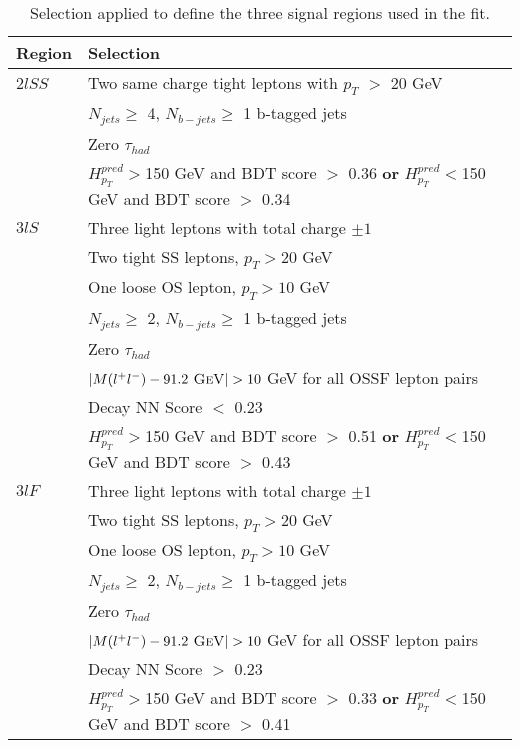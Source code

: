 \begin{table}[H]
  \begin{center}
  \begin{tabular}{ll}
  \hline\hline
  Region & Selection \\
  \hline
  $2lSS$ & Two same charge tight leptons with $p_T$ $>$ 20 GeV \\
  & $N_{jets}\geq$ 4, $N_{b-jets}\geq$ 1 b-tagged jets \\
  & Zero $\tau_{had}$\\
  & $H^{pred}_{p_T}>$150 GeV and BDT score $>$ 0.36 \textbf{or} $H^{pred}_{p_T}<$150 GeV and BDT score $>$ 0.34 \\
  \hline
  $3lS$ & Three light leptons with total charge $\pm 1$ \\
  & Two tight SS leptons, $p_T > 20$ GeV \\
  & One loose OS lepton, $p_T > 10$ GeV \\
  & $N_{jets}\geq$ 2, $N_{b-jets}\geq$ 1 b-tagged jets \\
  & Zero $\tau_{had}$ \\           
  & $|M(l^+l^-)-91.2\textsc{ GeV}| > 10$ GeV for all OSSF lepton pairs \\
  & Decay NN Score $<$ 0.23 \\
  & $H^{pred}_{p_T}>$150 GeV and BDT score $>$ 0.51 \textbf{or} $H^{pred}_{p_T}<$150 GeV and BDT score $>$ 0.43 \\
  \hline
  $3lF$ & Three light leptons with total charge $\pm 1$ \\
  & Two tight SS leptons, $p_T > 20$ GeV \\                                                                                  
  & One loose OS lepton, $p_T > 10$ GeV \\                                                                                   
  & $N_{jets}\geq$ 2, $N_{b-jets}\geq$ 1 b-tagged jets \\
  & Zero $\tau_{had}$ \\
  & $|M(l^+l^-)-91.2\textsc{ GeV}| > 10$ GeV for all OSSF lepton pairs \\                                                 
  & Decay NN Score $>$ 0.23 \\
  & $H^{pred}_{p_T}>$150 GeV and BDT score $>$ 0.33 \textbf{or} $H^{pred}_{p_T}<$150 GeV and BDT score $>$ 0.41 \\
  \hline\hline
  \end{tabular}
  \end{center}
  \caption{Selection applied to define the three signal regions used in the fit.}
  \label{tab:sigRegionCuts}
\end{table}

